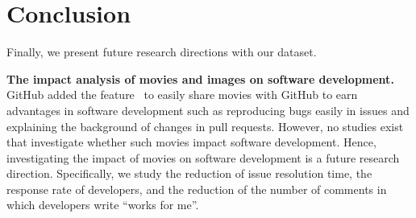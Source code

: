 \section{Conclusion}
\label{sec:conclusion}


Finally, we present future research directions with our dataset. 


\noindent
\textbf{The impact analysis of movies and images on software development.}
GitHub added the feature~\citep{github-video-blog} to easily 
share movies with GitHub to earn advantages 
in software development such as reproducing bugs easily in issues and 
explaining the background of changes in pull requests. 
However, no studies exist that investigate whether such movies 
impact software development. 
Hence, investigating the impact of movies on software development 
is a future research direction. 
Specifically, we study the reduction of issue resolution time, 
the response rate of developers, and 
the reduction of the number of comments 
in which developers write ``works for me''. 

